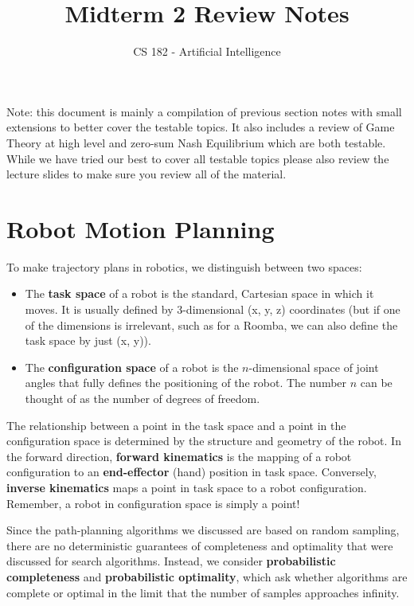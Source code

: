\documentclass[11pt]{article}
\title{Midterm 2 Review Notes}
\author{CS 182 - Artificial Intelligence}
\date{}
\begin{document}
\maketitle

\renewcommand{\labelenumii}{\arabic{enumii}.}
\setlength{\parindent}{0pt}

Note: this document is mainly a compilation of previous section notes with small extensions to better cover the testable topics. It also includes a review of Game Theory at high level and zero-sum Nash Equilibrium which are both testable. While we have tried our best to cover all testable topics please also review the lecture slides to make sure you review all of the material.

\section{Robot Motion Planning}

To make trajectory plans in robotics, we distinguish between two spaces:
\begin{itemize}
\item The {\bf{task space}} of a robot is the standard, Cartesian space in which it moves. It is usually defined by 3-dimensional (x, y, z) coordinates (but if one of the dimensions is irrelevant, such as for a Roomba, we can also define the task space by just (x, y)).
\item The {\bf{configuration space}} of a robot is the $n$-dimensional space of joint angles that fully defines the positioning of the robot. The number $n$ can be thought of as the number of degrees of freedom.
\end{itemize}

The relationship between a point in the task space and a point in the configuration space is determined by the structure and geometry of the robot. In the forward direction, {\bf{forward kinematics}} is the mapping of a robot configuration to an {\bf{end-effector}} (hand) position in task space. Conversely, {\bf{inverse kinematics}} maps a point in task space to a robot configuration. Remember, a robot in configuration space is simply a point!

Since the path-planning algorithms we discussed are based on random sampling, there are no deterministic guarantees of completeness and optimality that were discussed for search algorithms. Instead, we consider {\bf{probabilistic completeness}} and {\bf{probabilistic optimality}}, which ask whether algorithms are complete or optimal in the limit that the number of samples approaches infinity.
\end{document}
